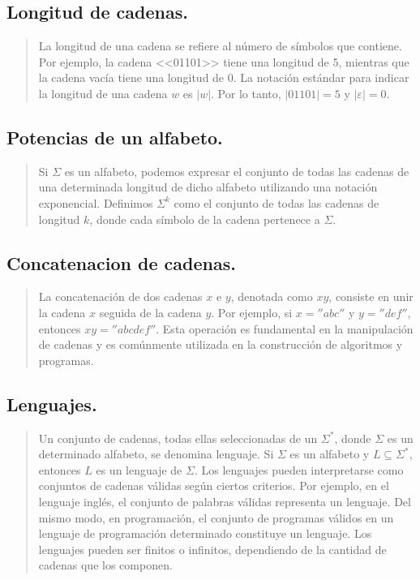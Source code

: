 \documentclass{article}
\begin{document}
    \subsection{Longitud de cadenas.}
        \begin{quote}
            La longitud de una cadena se refiere al número de símbolos que contiene. Por ejemplo, la cadena <<01101>> tiene una longitud
            de 5, mientras que la cadena vacía tiene una longitud de 0. La notación estándar para indicar la longitud de una cadena $w$
            es $|w|$. Por lo tanto, $|01101| = 5$ y $|\varepsilon| = 0$.\cite{hopcroft2007introduccion}
        \end{quote}

    \subsection{Potencias de un alfabeto.}
        \begin{quote}
            Si $\Sigma$ es un alfabeto, podemos expresar el conjunto de todas las cadenas de una determinada longitud de dicho alfabeto
            utilizando una notación exponencial. Definimos $\Sigma^k$ como el conjunto de todas las cadenas de longitud $k$, donde cada
            símbolo de la cadena pertenece a $\Sigma$.\cite{hopcroft2007introduccion}
        \end{quote}

    \subsection{Concatenacion de cadenas.}
        \begin{quote}
            La concatenación de dos cadenas $x$ e $y$, denotada como $xy$, consiste en unir la cadena $x$ seguida de la cadena $y$.
            Por ejemplo, si $x = ''abc''$ y $y = ''def''$, entonces $xy = ''abcdef''$. Esta operación es fundamental en la manipulación de cadenas
            y es comúnmente utilizada en la construcción de algoritmos y programas.\cite{hopcroft2007introduccion}
        \end{quote}
    \subsection{Lenguajes.}
        \begin{quote}
            Un conjunto de cadenas, todas ellas seleccionadas de un $\Sigma^*$, donde $\Sigma$ es un determinado alfabeto, se denomina
            lenguaje. Si $\Sigma$ es un alfabeto y $L \subseteq \Sigma^*$, entonces $L$ es un lenguaje de $\Sigma$. Los lenguajes pueden
            interpretarse como conjuntos de cadenas válidas según ciertos criterios. Por ejemplo, en el lenguaje inglés, el conjunto de
            palabras válidas representa un lenguaje. Del mismo modo, en programación, el conjunto de programas válidos en un lenguaje de
            programación determinado constituye un lenguaje. Los lenguajes pueden ser finitos o infinitos, dependiendo de la cantidad de
            cadenas que los componen.\cite{hopcroft2007introduccion}
        \end{quote}
\end{document}
